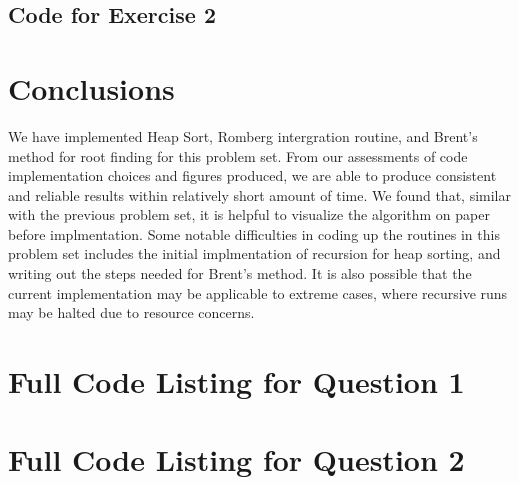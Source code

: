 \documentclass{article}
\begin{document}
  \subsection{Code for Exercise 2}
     
    \pagebreak

\section{Conclusions}
  We have implemented Heap Sort, Romberg intergration routine, and Brent's method for 
  root finding for this problem set. From our assessments of code implementation 
  choices and figures produced, we are able to produce consistent and reliable results
  within relatively short amount of time. We found that, similar with the previous 
  problem set, it is helpful to visualize the algorithm on paper before implmentation.
  Some notable difficulties in coding up the routines in this problem set includes 
  the initial implmentation of recursion for heap sorting, and writing out the steps 
  needed for Brent's method. It is also possible that the current implementation may 
  be applicable to extreme cases, where recursive runs may be halted due to resource
  concerns.
  \pagebreak

\appendix
\section{Full Code Listing for Question 1}
   
  \pagebreak

\section{Full Code Listing for Question 2}
   
  \pagebreak
\end{document}
